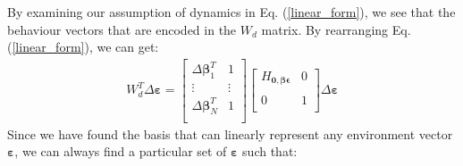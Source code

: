 By examining our assumption of dynamics in Eq. (\ref{linear_form}), we see that the behaviour vectors that are encoded in the $W_d$ matrix.
By rearranging Eq. (\ref{linear_form}), we can get:
\begin{equation}
\begin{gathered}
W_{d}^T \Delta \bm{\varepsilon} = 
\begin{bmatrix}
\Delta \bm{\beta}_1^T & 1\\
\vdots & \vdots \\
\Delta \bm{\beta}_N^T & 1\\
\end{bmatrix}
%
\begin{bmatrix}
H_{\bm{0, \beta \epsilon}} & 0 \\
\\
0 & 1 \\
\end{bmatrix}
\Delta \bm{\varepsilon}
\end{gathered}
\label{linear_form_for_beta}
\end{equation}
Since we have found the basis that can linearly represent any environment vector $\bm{\varepsilon}$, we can always find a particular set of $\bm{\varepsilon}$ such that:

